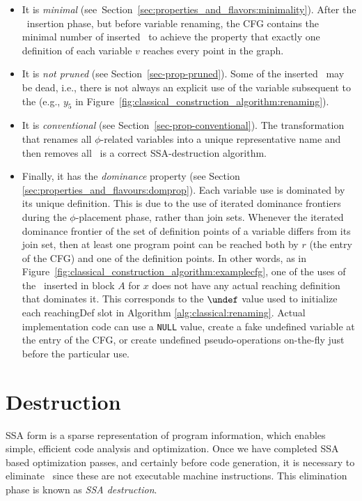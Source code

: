 {\begin{itemize}
\item It is \textit{minimal} (see~Section~\ref{sec:properties_and_flavors:minimality}).
After the \phifun\ insertion phase,
but before variable renaming, the CFG contains the minimal 
number of inserted \phifuns\ to achieve the property that exactly
one definition of each variable $v$ reaches every point in the graph.
\item It is \textit{not pruned} (see Section~\ref{sec-prop-pruned}).
Some of the inserted \phifuns\
may be dead, i.e., there is not always an explicit use of the variable subsequent
to the \phifun (e.g., $y_5$ in Figure~\ref{fig:classical_construction_algorithm:renaming}).
\item It is \textit{conventional} (see Section~\ref{sec-prop-conventional}).
The transformation that renames all $\phi$-related variables into a
unique representative name and then removes all \phifuns\ is a correct SSA-destruction algorithm.
\item Finally, it has the \textit{dominance} property (see Section
\ref{sec:properties_and_flavours:domprop}).\index{strict SSA form}
Each variable use is dominated by its unique definition. 
This is due to the use of iterated dominance frontiers
during the $\phi$-placement phase,
rather than join sets. Whenever the iterated dominance frontier
of the set of definition points of a variable differs from its join
set, then at least one program point can be reached both by $r$ (the
entry of the CFG) and one of the definition points. In other words, as
in Figure~\ref{fig:classical_construction_algorithm:examplecfg}, one
of the uses of the \phifun\ inserted in block $A$ for $x$ does not have
any actual reaching definition that dominates it. This corresponds to
the $\undef$ value used to initialize each reachingDef slot in Algorithm
\ref{alg:classical:renaming}.
Actual implementation code can use a \texttt{NULL} value, create a
fake undefined variable at the entry of the CFG, or create
undefined pseudo-operations on-the-fly just before the particular use.
\end{itemize}


\section{Destruction}
\label{sec:classical_construction_algorithm:destruction}
SSA form is a sparse representation of program information,
which enables simple, efficient code analysis and optimization.
Once we have completed SSA based optimization passes,
and certainly before code generation,
it is necessary to eliminate \phifuns\ since these
are not executable machine instructions.
This elimination phase is known as \textit{SSA destruction}. 

}
